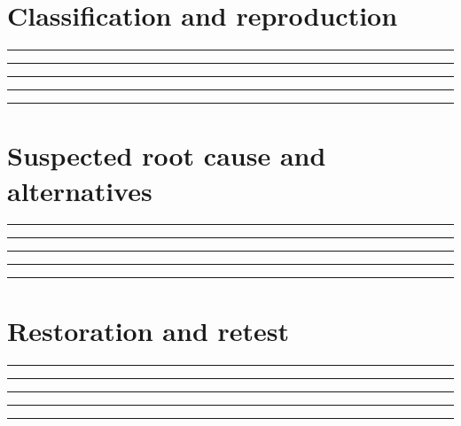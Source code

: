 \documentclass[11pt,letterpaper]{article}
\begin{document}
\section{Classification and reproduction}
\vspace{2mm}
\noindent\rule{0.93\linewidth}{0.4pt}\par\vspace{13pt}
\noindent\rule{0.93\linewidth}{0.4pt}\par\vspace{13pt}
\noindent\rule{0.93\linewidth}{0.4pt}\par\vspace{13pt}
\noindent\rule{0.93\linewidth}{0.4pt}\par\vspace{13pt}
\noindent\rule{0.93\linewidth}{0.4pt}\par\vspace{13pt}
\section{Suspected root cause and alternatives}
\vspace{2mm}
\noindent\rule{0.93\linewidth}{0.4pt}\par\vspace{13pt}
\noindent\rule{0.93\linewidth}{0.4pt}\par\vspace{13pt}
\noindent\rule{0.93\linewidth}{0.4pt}\par\vspace{13pt}
\noindent\rule{0.93\linewidth}{0.4pt}\par\vspace{13pt}
\noindent\rule{0.93\linewidth}{0.4pt}\par\vspace{13pt}
\section{Restoration and retest}
\vspace{2mm}
\noindent\rule{0.93\linewidth}{0.4pt}\par\vspace{13pt}
\noindent\rule{0.93\linewidth}{0.4pt}\par\vspace{13pt}
\noindent\rule{0.93\linewidth}{0.4pt}\par\vspace{13pt}
\noindent\rule{0.93\linewidth}{0.4pt}\par\vspace{13pt}
\noindent\rule{0.93\linewidth}{0.4pt}\par\vspace{13pt}
\end{document}
